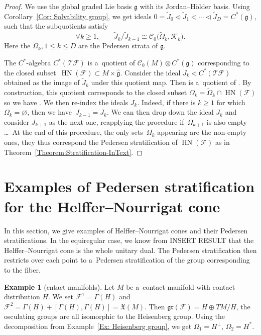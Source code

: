 \documentclass[pdftex]{sigma}
\newcommand{\CCC}{\mathscr{C}} %
\newcommand{\F}{\mathcal{F}} %
\newcommand{\g}{\mathfrak{g}} %
\newcommand{\T}{\mathcal{T}} %
\newcommand{\HN}{\operatorname{HN}} %
\newcommand{\Fb}{\mathcal{F}} %
\newcommand{\gr}{\mathfrak{gr}} %
\numberwithin{equation}{section}
\theoremstyle{definition}
\newtheorem{ex}[thm]{Example}
\begin{document}
\begin{proof} We use the global graded Lie basis $\g$ with its Jordan--H\"older basis. Using Corollary~\ref{Cor: Solvability group}, we get ideals $0 = \widetilde{J}_0 \triangleleft \widetilde{J}_1 \triangleleft \cdots \triangleleft \widetilde{J}_D = C^*(\g)$,
 such that the subquotients satisfy
 \[\forall k \geq 1,\qquad {\widetilde{J}_k}/{\widetilde{J}_{k-1}} \cong \CCC_0\bigl(\widetilde{\Omega}_k,\mathcal{K}_k\bigr).\]
 Here the $\widetilde{\Omega}_k, 1\leq k \leq D$ are the Pedersen strata of $\g$.

 The $C^*$-algebra $C^*(\T\F)$ is a~quotient of $\CCC_0(M) \otimes C^*(\g)$ corresponding to the closed subset~${\HN(\F) \subset M \times \widehat{\g}}$. Consider the ideal $J_k \triangleleft C^*(\T\F)$ obtained as the image of $\widetilde{J}_k$ under this quotient map.
 Then  is a~quotient of . By construction, this quotient corresponds to the closed subset $\Omega_k = \widetilde{\Omega}_k \cap \HN(\Fb)$ so we have
 \smash{${J_k}/{J_{k-1}} \cong \CCC_0(\Omega_k,\mathcal{K}_k)$}.
 We then re-index the ideals $J_k$. Indeed, if there is $k\geq 1$ for which $\Omega_k = \varnothing$, then we have~${J_{k-1} = J_k}$. We can then drop down the ideal $J_k$ and consider $J_{k+1}$ as the next one, reapplying the procedure if~$\Omega_{k+1}$ is also empty \dots\ At the end of this procedure, the only sets~$\Omega_k$ appearing are the non-empty ones, they thus correspond the Pedersen stratification of $\HN(\F)$ as in Theorem~\ref{Theorem:Stratification-InText}.
\end{proof}

\section[Examples of Pedersen stratification for the Helffer--Nourrigat cone]{Examples of Pedersen stratification\\ for the Helffer--Nourrigat cone}\label{Section: ExamplesCones}

In this section, we give examples of Helffer--Nourrigat cones and their Pedersen stratifications. In the equiregular case, we know from INSERT RESULT that the Helffer--Nourrigat cone is the whole unitary dual. The Pedersen stratification then restricts over each point to a~Pedersen stratification of the group corresponding to the fiber.

\begin{ex}[cntact manifolds]
 Let $M$ be a~contact manifold with contact distribution $H$. We set $\F^1 = \Gamma(H)$ and $\F^2 = \Gamma(H) + [\Gamma(H),\Gamma(H)] = \mathfrak{X}(M)$. Then $\gr(\Fb) = H \oplus {TM}/{H}$, the osculating groups are all isomorphic to the Heisenberg group. Using the decomposition from Example~\ref{Ex: Heisenberg group}, we get $
 \Omega_1 = H^{\perp}$, $\Omega_2 = H^*$.
\end{ex}
\end{document}
